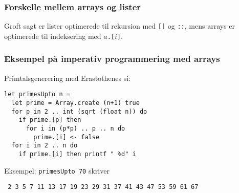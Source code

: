 \documentclass{beamer}
\begin{document}
\begin{frame}
\frametitle{Forskelle mellem arrays og lister}


\vspace{0.8ex}

Groft sagt er lister optimerede til rekursion med \texttt{[]} og
\texttt{::}, mens arrays er optimerede til indeksering med
\texttt{$a$.[$i$]}.

\end{frame}

\begin{frame}[fragile=singleslide]
\frametitle{Eksempel på imperativ programmering med arrays}

Primtalsgenerering med Erastothenes si:

\begin{verbatim}
let primesUpto n =
  let prime = Array.create (n+1) true
  for p in 2 .. int (sqrt (float n)) do
    if prime.[p] then
      for i in (p*p) .. p .. n do
        prime.[i] <- false
  for i in 2 .. n do
    if prime.[i] then printf " %d" i
\end{verbatim}

Eksempel: \texttt{primesUpto 70} skriver


\begin{verbatim}
 2 3 5 7 11 13 17 19 23 29 31 37 41 43 47 53 59 61 67
\end{verbatim}

\end{frame}
\end{document}
